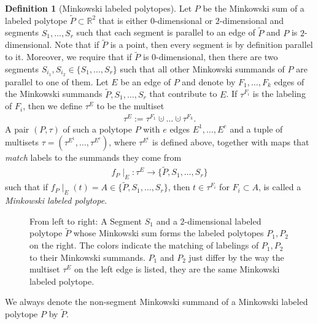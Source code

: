 \documentclass[11pt,reqno,a4]{amsart}
\theoremstyle{dotless}
\theoremstyle{definition}
\newtheorem{definition}[corollary]{Definition}
\begin{document}
\begin{definition}[Minkowski labeled polytopes]\label{definition:Minkowski_labeled_polytopes}
Let $P$ be the Minkowski sum of a labeled polytope $\tilde{P}\subset\mathbb{R}^2$ that is either $0$-dimensional or $2$-dimensional and segments $S_1,\dots,S_r$ such that each segment is parallel to an edge of $\tilde{P}$ and $P$ is $2$-dimensional. Note that if $\tilde{P}$ is a point, then every segment is by definition parallel to it. Moreover, we require that if $\tilde{P}$ is $0$-dimensional, then there are two segments $S_{i_1},S_{i_2}\in\lbrace S_1,\dots, S_r\rbrace$ such that all other Minkowski summands of $P$ are parallel to one of them. Let $E$ be an edge of $P$ and denote by $F_1,\dots,F_k$ edges of the Minkowski summands $\tilde{P},S_1,\dots,S_r$ that contribute to $E$. If $\tau^{F_i}$ is the labeling of $F_i$, then we define $\mathcal{\tau}^E$ to be the multiset
\begin{align*}
\tau^E:=\tau^{F_1}\cupdot\dots\cupdot\tau^{F_k}.
\end{align*}
A pair $\left( P,\tau \right)$ of such a polytope $P$ with $e$ edges $E^1,\dots,E^e$ and a tuple of multisets $\tau=\left( \tau^{E^1},\dots,\tau^{E^e} \right)$, where $\tau^{E^i}$ is defined above, together with maps that \textit{match} labels to the summands they come from
\begin{align*}
f_P\mid_E:\tau^E \to \lbrace \tilde{P},S_1,\dots,S_r \rbrace
\end{align*}
such that if $f_P\mid_E(t)=A\in\lbrace \tilde{P},S_1,\dots,S_r \rbrace$, then $t\in\tau^{F_i}$ for $F_i\subset A$, is called a \textit{Minkowski labeled polytope}.
\end{definition}



\begin{figure}[H]
\centering
\def\svgwidth{400pt}

\caption{From left to right: A Segment $S_1$ and a $2$-dimensional labeled polytope $\tilde{P}$ whose Minkowski sum forms the labeled polytopes $P_1,P_2$ on the right. The colors indicate the matching of labelings of $P_1,P_2$ to their Minkowski summands. $P_1$ and $P_2$ just differ by the way the multiset $\tau^E$ on the left edge is listed, they are the same Minkowski labeled polytope.}
\label{Example_uniquely_labeled_polytope}
\end{figure}

We always denote the non-segment Minkowski summand of a Minkowski labeled polytope $P$  by $\tilde{P}$.
\end{document}
